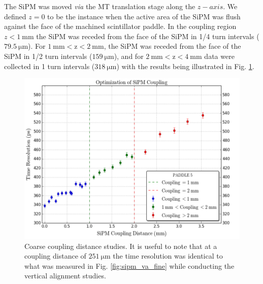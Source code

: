 The SiPM was moved \textit{via} the MT translation stage along the $z-axis$.  We defined $z = 0$ to be the instance when the active area of the SiPM was flush against the face of the machined scintillator paddle.  In the coupling region $z < 1\ \mathrm{mm}$ the SiPM was receded from the face of the SiPM in 1/4 turn intervals ($79.5\ \mathrm{\mu m}$).  For $\mathrm{1\ mm < z < 2\ mm}$, the SiPM was receded from the face of the SiPM in 1/2 turn intervals ($159\ \mathrm{\mu m}$), and for $\mathrm{2\ mm < z < 4\ mm}$ data were collected in 1 turn intervals ($\mathrm{318\ \mu m}$) with the results being illustrated in Fig. \ref{fig:sipm_coupling_coarse}.
\begin{figure}[!htb]
	\centering
	\includegraphics[width=1.0\columnwidth]{misalignment/figs/sipm_coupling_coarse}
	\caption{Coarse coupling distance studies.  It is useful to note that at a coupling distance of $\mathrm{251\ \mu m}$ the time resolution was identical to what was measured in Fig. \ref{fig:sipm_va_fine} while conducting the vertical alignment studies.}
	\label{fig:sipm_coupling_coarse}
\end{figure}


